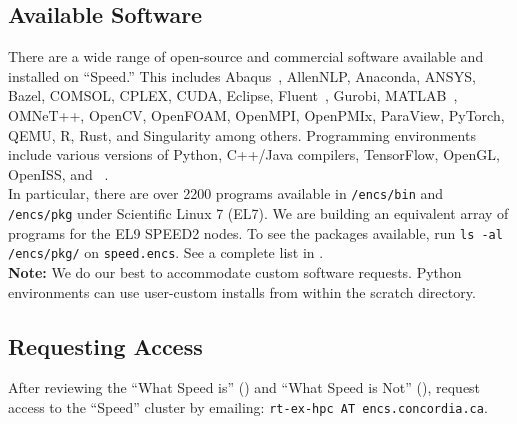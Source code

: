\documentclass{easychair}
\begin{document}
\subsection{Available Software}
\label{sect:available-software}

There are a wide range of open-source and commercial software available and installed on ``Speed.'' 
This includes Abaqus~\cite{abaqus}, AllenNLP, Anaconda, ANSYS, Bazel,
COMSOL, CPLEX, CUDA, Eclipse, Fluent~\cite{fluent}, Gurobi, MATLAB~\cite{matlab,scholarpedia-matlab}, 
OMNeT++, OpenCV, OpenFOAM, OpenMPI, OpenPMIx, ParaView, PyTorch, QEMU, R, Rust, and Singularity among others.
Programming environments include various versions of Python, C++/Java compilers, TensorFlow, OpenGL, OpenISS, and {\marf}~\cite{marf}.\\

In particular, there are over 2200 programs available in \texttt{/encs/bin} and \texttt{/encs/pkg} under Scientific Linux 7 (EL7).
We are building an equivalent array of programs for the EL9 SPEED2 nodes. To see the packages available, run \texttt{ls -al /encs/pkg/} on \texttt{speed.encs}.
See a complete list in .\\

\noindent
\textbf{Note:} We do our best to accommodate custom software requests. Python environments can use user-custom installs 
from within the scratch directory.

\subsection{Requesting Access}
\label{sect:access-requests}

After reviewing the ``What Speed is'' () and
``What Speed is Not'' (), request access to the ``Speed'' 
cluster by emailing: \texttt{rt-ex-hpc AT encs.concordia.ca}.
\end{document}
